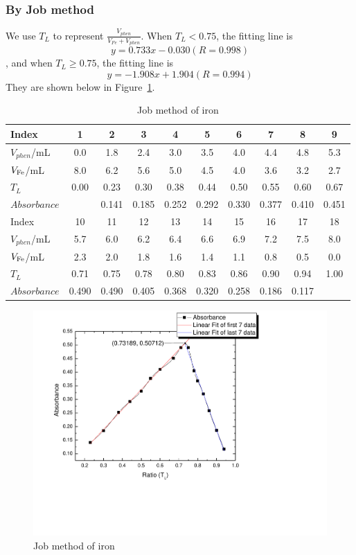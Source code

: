 \subsubsection{By Job method}

We use $T_L$ to represent $\frac{V_{phen}}{V_{Fe}+V_{phen}}$. When $T_L<0.75$, the fitting line is$$y=0.733x-0.030(R=0.998)$$, and when $T_L\geq0.75$, the fitting line is$$y=-1.908x+1.904(R=0.994)$$They are shown below in Figure~\ref{iron}.

\begin{table}[H]
	\caption{Job method of iron}
	\label{Tab.Jbm}
	\begin{tabular}{lccccccccc}
	\toprule
	Index
	& 1 	& 2	 	&3		& 4 	& 5 	& 6 	& 7 	& 8		& 9\\
	\midrule
	$V_{phen}$/mL
	&0.0	&1.8	&2.4	&3.0	&3.5	&4.0	&4.4	&4.8	&5.3\\
	$V_{\ce{Fe}}$/mL
	&8.0	&6.2	&5.6	&5.0	&4.5	&4.0	&3.6	&3.2	&2.7\\
	$T_L$
	& 0.00 	&0.23	&0.30	&0.38	&0.44	&0.50	&0.55	&0.60	&0.67\\
	$Absorbance$
	&   	&0.141	&0.185	&0.252	&0.292	&0.330	&0.377	&0.410	&0.451\\
	\toprule
	Index
	& 10	& 11	& 12	&13		&14		&15		&16		&17		&18\\
	\midrule
	$V_{phen}$/mL
	&5.7	&6.0	&6.2	&6.4	&6.6	&6.9	&7.2	&7.5	&8.0\\
	$V_{\ce{Fe}}$/mL
	&2.3	&2.0	&1.8	&1.6	&1.4	&1.1	&0.8	&0.5	&0.0\\
	$T_L$
	&0.71	&0.75	&0.78	&0.80	&0.83	&0.86	&0.90	&0.94	&1.00\\
	$Absorbance$
	&0.490	&0.490	&0.405	&0.368	&0.320	&0.258	&0.186	&0.117	&\\
	\bottomrule
	\end{tabular}
\end{table}

\begin{figure}[H]
	\includegraphics[width=\linewidth]{iron.pdf}
	\caption{Job method of iron}
	\label{iron}
\end{figure}

